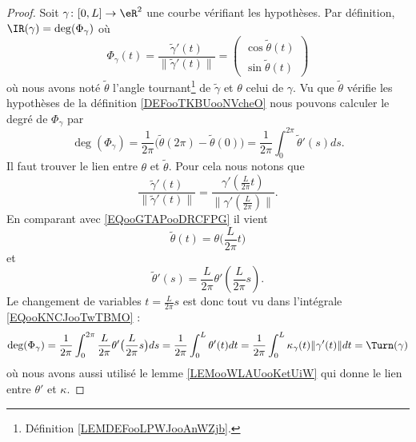 \begin{proof}
    Soit \( \gamma\colon \mathopen[ 0 , L \mathclose]\to \eR^2\) une courbe vérifiant les hypothèses. Par définition, \( \IR(\gamma)=\deg(\Phi_{\gamma})\) où
    \begin{equation}        \label{EQooGTAPooDRCFPG}
        \Phi_{\gamma}(t)=\frac{ \tilde \gamma'(t) }{ \| \tilde \gamma'(t) \| }=\begin{pmatrix}
            \cos \tilde \theta(t)    \\ 
            \sin \tilde \theta(t)    
        \end{pmatrix}
    \end{equation}
    où nous avons noté \( \tilde \theta\) l'angle tournant\footnote{Définition \ref{LEMDEFooLPWJooAnWZjb}.} de \( \tilde \gamma\) et \( \theta\) celui de \( \gamma\). Vu que \( \tilde \theta\) vérifie les hypothèses de la définition \ref{DEFooTKBUooNVcheO} nous pouvons calculer le degré de \( \Phi_{\gamma}\) par
    \begin{equation}        \label{EQooKNCJooTwTBMO}
        \deg(\Phi_{\gamma})=\frac{1}{ 2\pi }\big( \tilde \theta(2\pi)-\tilde \theta(0) \big)=\frac{1}{ 2\pi }\int_0^{2\pi}\tilde \theta'(s)ds.
    \end{equation}
    Il faut trouver le lien entre \( \theta\) et \( \tilde \theta\). Pour cela nous notons que
    \begin{equation}
        \frac{ \tilde \gamma'(t) }{ \| \tilde \gamma'(t) \| }=\frac{ \gamma'\left( \frac{ L }{ 2\pi }t \right) }{ \| \gamma'\left( \frac{ L }{ 2\pi } \right) \| }.
    \end{equation}
    En comparant avec \eqref{EQooGTAPooDRCFPG} il vient
    \begin{equation}
        \tilde \theta(t)=\theta\big( \frac{ L }{ 2\pi }t \big)
    \end{equation}
    et
    \begin{equation}
        \tilde \theta'(s)=\frac{ L }{ 2\pi }\theta'\left( \frac{ L }{ 2\pi }s \right).
    \end{equation}
    Le changement de variables \( t=\frac{ L }{ 2\pi }s\) est donc tout vu dans l'intégrale \eqref{EQooKNCJooTwTBMO} :
    \begin{equation}
        \deg(\Phi_{\gamma})=\frac{1}{ 2\pi }\int_0^{2\pi}\frac{ L }{ 2\pi }\theta'\big( \frac{ L }{ 2\pi }s \big)ds=\frac{1}{ 2\pi }\int_0^L\theta'(t)dt=\frac{1}{ 2\pi }\int_0^L\kappa_{\gamma}(t)\| \gamma'(t) \|dt=\Turn(\gamma)
    \end{equation}
    où nous avons aussi utilisé le lemme \ref{LEMooWLAUooKetUiW} qui donne le lien entre \( \theta'\) et \( \kappa\).
\end{proof}

